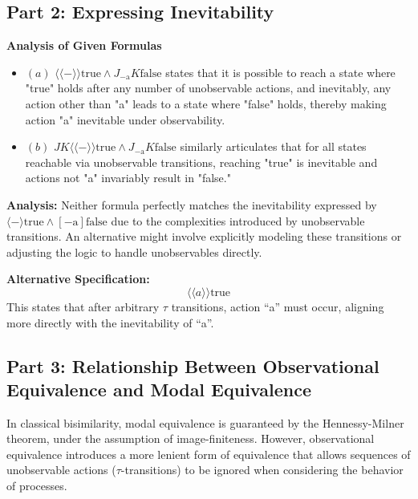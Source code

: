 \documentclass{article}
\begin{document}
\subsection{Part 2: Expressing Inevitability}

\textbf{Analysis of Given Formulas}
\begin{itemize}
    \item $(a)$ $\langle\langle - \rangle\rangle \text{true} \land J_{-\text{a}}K\text{false}$ states that it is possible to reach a state where "true" holds after any number of unobservable actions, and inevitably, any action other than "a" leads to a state where "false" holds, thereby making action "a" inevitable under observability.
    \item $(b)$ $JK\langle\langle - \rangle\rangle \text{true} \land J_{-\text{a}}K\text{false}$ similarly articulates that for all states reachable via unobservable transitions, reaching "true" is inevitable and actions not "a" invariably result in "false."
\end{itemize}

\textbf{Analysis:}
Neither formula perfectly matches the inevitability expressed by $\langle - \rangle\text{true} \land [-\text{a}]\text{false}$ due to the complexities introduced by unobservable transitions. An alternative might involve explicitly modeling these transitions or adjusting the logic to handle unobservables directly.

\textbf{Alternative Specification:}
\begin{equation*}
    \langle\langle a \rangle\rangle \text{true}
\end{equation*}
This states that after arbitrary $\tau$ transitions, action ``a'' must occur, aligning more directly with the inevitability of ``a''.

\subsection{Part 3: Relationship Between Observational Equivalence and Modal Equivalence}

In classical bisimilarity, modal equivalence is guaranteed by the Hennessy-Milner theorem, under the assumption of image-finiteness. However, observational equivalence introduces a more lenient form of equivalence that allows sequences of unobservable actions ($\tau$-transitions) to be ignored when considering the behavior of processes.
\end{document}
